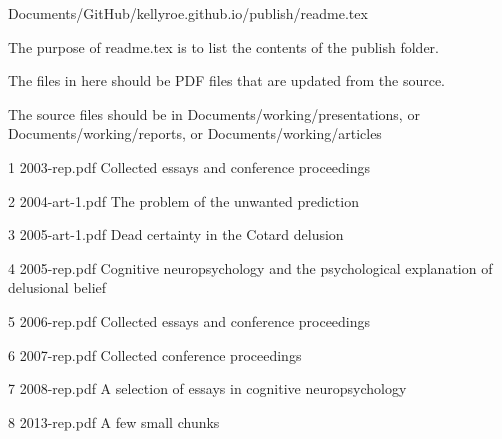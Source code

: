 Documents/GitHub/kellyroe.github.io/publish/readme.tex

The purpose of readme.tex is to list the contents of the publish folder.

The files in here should be PDF files that are updated from the source. 

The source files should be in Documents/working/presentations, or Documents/working/reports, or Documents/working/articles

1  2003-rep.pdf Collected essays and conference proceedings

2  2004-art-1.pdf  The problem of the unwanted prediction

3  2005-art-1.pdf  Dead certainty in the Cotard delusion

4  2005-rep.pdf  Cognitive neuropsychology and the psychological explanation of delusional belief

5  2006-rep.pdf  Collected essays and conference proceedings

6  2007-rep.pdf  Collected conference proceedings

7  2008-rep.pdf  A selection of essays in cognitive neuropsychology

8  2013-rep.pdf  A few small chunks